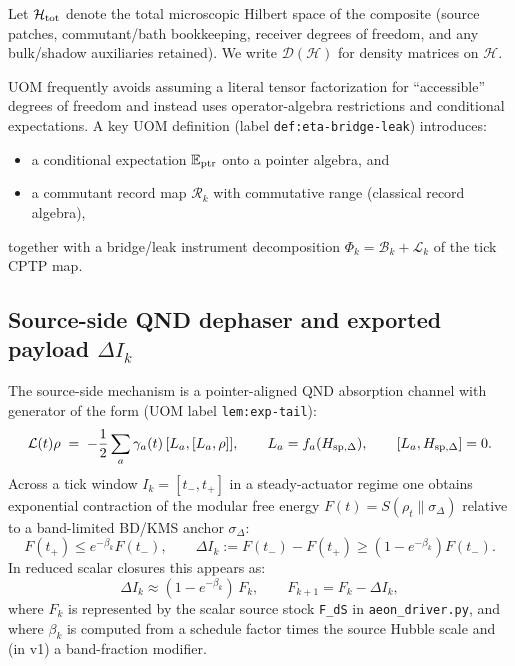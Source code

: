 \documentclass[11pt]{article}
\theoremstyle{definition}
\theoremstyle{plain}
\theoremstyle{remark}
\newcommand{\cH}{\mathcal H}
\newcommand{\cD}{\mathcal D}
\newcommand{\cB}{\mathcal B}
\newcommand{\cL}{\mathcal L}
\newcommand{\cR}{\mathcal R}
\begin{document}
Let $\cH_{\rm tot}$ denote the total microscopic Hilbert space of the composite (source patches, commutant/bath bookkeeping,
receiver degrees of freedom, and any bulk/shadow auxiliaries retained).
We write $\cD(\cH)$ for density matrices on $\cH$.

UOM frequently avoids assuming a literal tensor factorization for ``accessible'' degrees of freedom and instead uses
operator-algebra restrictions and conditional expectations. A key UOM definition (label
\texttt{def:eta-bridge-leak}) introduces:
\begin{itemize}[leftmargin=1.6em]
\item a conditional expectation $\mathbb E_{\rm ptr}$ onto a pointer algebra, and
\item a commutant record map $\cR_k$ with commutative range (classical record algebra),
\end{itemize}
together with a bridge/leak instrument decomposition $\Phi_k=\cB_k+\cL_k$ of the tick CPTP map.

\subsection{Source-side QND dephaser and exported payload $\Delta I_k$}
\label{subsec:qnd-payload}

The source-side mechanism is a pointer-aligned QND absorption channel with generator of the form (UOM label
\texttt{lem:exp-tail}):
\begin{equation}
\cL(t)\rho \;=\; -\frac12 \sum_a \gamma_a(t)\,[L_a,[L_a,\rho]],
\qquad L_a=f_a(H_{{\rm sp},\Delta}),\qquad [L_a,H_{{\rm sp},\Delta}]=0.
\label{eq:qnd-generator}
\end{equation}
Across a tick window $I_k=[t_-,t_+]$ in a steady-actuator regime one obtains exponential contraction of the modular
free energy $F(t)=S(\rho_t\|\sigma_\Delta)$ relative to a band-limited BD/KMS anchor $\sigma_\Delta$:
\begin{equation}
F(t_+) \le e^{-\beta_k}F(t_-),
\qquad
\Delta I_k := F(t_-)-F(t_+)\ge (1-e^{-\beta_k})F(t_-).
\label{eq:payload-lower-bound}
\end{equation}
In reduced scalar closures this appears as:
\begin{equation}
\Delta I_k \approx (1-e^{-\beta_k})\,F_k,
\qquad
F_{k+1}=F_k-\Delta I_k,
\label{eq:sim-payload-update}
\end{equation}
where $F_k$ is represented by the scalar source stock \texttt{F\_dS} in \texttt{aeon\_driver.py}, and where
$\beta_k$ is computed from a schedule factor times the source Hubble scale and (in v1) a band-fraction modifier.
\end{document}
